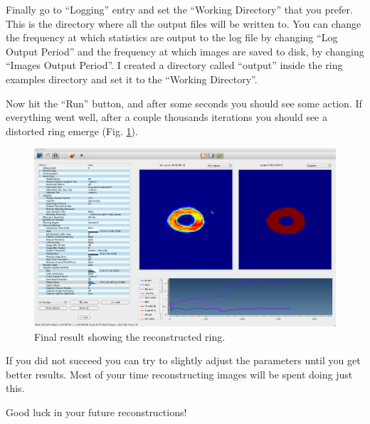 \documentclass[a4paper]{article}
\begin{document}
Finally go to ``Logging'' entry and set the ``Working Directory'' that
you prefer. This is the directory where all the output files will be
written to. You can change the frequency at which statistics are
output to the log file by changing ``Log Output Period'' and the
frequency at which images are saved to disk, by changing ``Images
Output Period''. I created a directory called ``output'' inside the
ring examples directory and set it to the ``Working Directory''.

Now hit the ``Run'' button, and after some seconds you should see some action.
If everything went well, after a couple thousands iterations you
should see a distorted ring emerge (Fig. \ref{reconstructed-ring}).

\begin{figure}[h!]
\centering
\includegraphics[width=1\textwidth]{reconstructed-ring.png}
\caption{Final result showing the reconstructed ring.}
\label{reconstructed-ring}
\end{figure}

If you did not succeed you can try to slightly adjust the parameters
until you get better results. Most of your time reconstructing images
will be spent doing just this.

Good luck in your future reconstructions!
%
%
\end{document}
